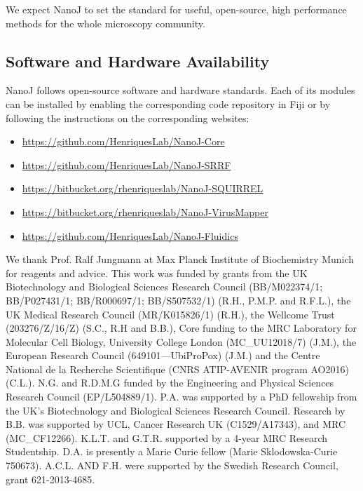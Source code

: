 We expect NanoJ to set the standard for useful, open-source, high performance methods for the whole microscopy community.
 
\subsection*{Software and Hardware Availability}
 NanoJ follows open-source software and hardware standards. Each of its modules can be installed by enabling the corresponding code repository in Fiji or by following the instructions on the corresponding websites:
 \small
 \begin{itemize}
  \item \href{https://github.com/HenriquesLab/NanoJ-Core}{https://github.com/HenriquesLab/NanoJ-Core}
  \item \href{https://github.com/HenriquesLab/NanoJ-SRRF}{https://github.com/HenriquesLab/NanoJ-SRRF}
  \item \href{https://bitbucket.org/rhenriqueslab/nanoj-squirrel}{https://bitbucket.org/rhenriqueslab/NanoJ-SQUIRREL}
  \item \href{https://bitbucket.org/rhenriqueslab/NanoJ-VirusMapper}{https://bitbucket.org/rhenriqueslab/NanoJ-VirusMapper}
  \item \href{https://github.com/HenriquesLab/NanoJ-Fluidics}{https://github.com/HenriquesLab/NanoJ-Fluidics}
\end{itemize}

\begin{acknowledgements}
 We thank Prof. Ralf Jungmann at Max Planck Institute of Biochemistry Munich for reagents and advice. This work was funded by grants from the UK Biotechnology and Biological Sciences Research Council (BB/M022374/1; BB/P027431/1; BB/R000697/1; BB/S507532/1) (R.H., P.M.P. and R.F.L.), the UK Medical Research Council (MR/K015826/1) (R.H.), the Wellcome Trust (203276/Z/16/Z) (S.C., R.H and B.B.), Core funding to the MRC Laboratory for Molecular Cell Biology, University College London (MC\_UU12018/7) (J.M.), the European Research Council (649101—UbiProPox) (J.M.) and the Centre National de la Recherche Scientifique (CNRS ATIP-AVENIR program AO2016) (C.L.). N.G. and R.D.M.G funded by the Engineering and Physical Sciences Research Council (EP/L504889/1). P.A. was supported by a PhD fellowship from the UK’s Biotechnology and Biological Sciences Research Council. Research by B.B. was supported by UCL, Cancer Research UK (C1529/A17343), and MRC (MC\_CF12266). K.L.T. and G.T.R. supported by a 4-year MRC Research Studentship. D.A. is presently a Marie Curie fellow (Marie Sklodowska-Curie 750673). A.C.L. AND F.H. were supported by the Swedish Research Council, grant 621-2013-4685.
\end{acknowledgements}


